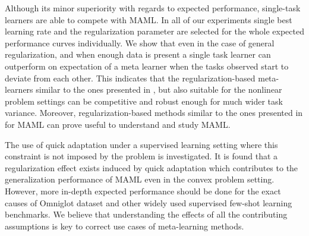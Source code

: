 Although its minor superiority with regards to expected performance, single-task learners are able to compete with MAML. In all of our experiments single best learning rate and the regularization parameter are selected for the whole expected performance curves individually. We show that even in the case of general regularization, and when enough data is present a single task learner can outperform on expectation of a meta learner when the tasks observed start to deviate from each other. This indicates that the regularization-based meta-learners similar to the ones presented in \cite{denevi2018}, but also suitable for the nonlinear problem settings can be competitive and robust enough for much wider task variance. Moreover, regularization-based methods similar to the ones presented in \cite{guiroy2019} for MAML can prove useful to understand and study MAML.

The use of quick adaptation under a supervised learning setting where this constraint is not imposed by the problem is investigated. It is found that a regularization effect exists induced by quick adaptation which contributes to the generalization performance of MAML even in the convex problem setting. However, more in-depth expected performance should be done for the exact causes of Omniglot dataset and other widely used supervised few-shot learning benchmarks. We believe that understanding the effects of all the contributing assumptions is key to correct use cases of meta-learning methods.


